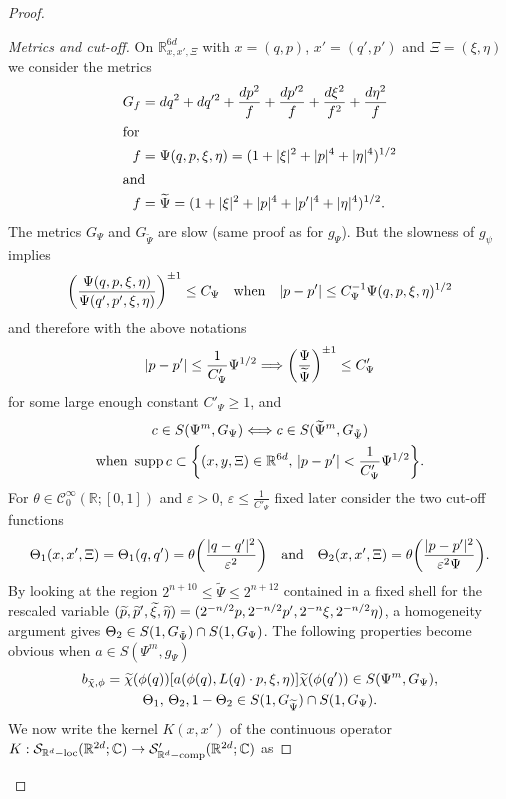 \documentclass[10pt]{amsart}
\theoremstyle{definition}\newtheorem{defi}[theo]{Definition}\newtheorem{rema}[theo]{Remark}\newtheorem{exam}[theo]{Example}\newtheorem{exem}[theo]{Example}\newtheorem{nota}[theo]{Notation}
\newcommand{\C}{\mathbb{C}}
\newcommand{\R}{\mathbb{R}}
\newcommand{\clC}{\mathcal{C}}
\newcommand{\clS}{\mathcal{S}}
\DeclareMathOperator{\ccomp}{comp}
\DeclareMathOperator{\suppp}{supp}
\DeclareMathOperator{\locc}{loc}
\let\oldtilde\tilde
\renewcommand*{\tilde}[1]{\mathchoice{\widetilde{#1}}{\widetilde{#1}}{\oldtilde{#1}}{\oldtilde{#1}}}
\let\originalleft\left
\let\originalright\right
\renewcommand{\left}{\mathopen{}\mathclose\bgroup\originalleft}
\renewcommand{\right}{\aftergroup\egroup\originalright}
\renewcommand*{\to}{\mathchoice{\longrightarrow}{\rightarrow}{\rightarrow}{\rightarrow}}
\renewcommand*{\implies}{\mathchoice{\Longrightarrow}{\Rightarrow}{\Rightarrow}{\Rightarrow}}
\begin{document}
\begin{proof}
\begin{proof}[{Metrics and cut-off}]
On $\R_{x,x',\Xi}^{6d}$ with $x=(q,p)$, $x'=(q',p')$ and $\Xi=(\xi,\eta)$ we consider the metrics
\begin{align*}
G_{f} &=dq^{2}+dq'^{2}+\frac{dp^{2}}{f}+\frac{dp'^{2}}{f}+\frac{d\xi^{2}}{f^{2}}+\frac{d\eta^{2}}{f}\\
\intertext{for}
f &=\Psi(q,p,\xi,\eta)=(1+|\xi|^{2}+|p|^{4}+|\eta|^{4})^{1/2}\\
\intertext{and} 
f &=\widetilde{\Psi}=(1+|\xi|^{2}+|p|^{4}+|p'|^{4}+|\eta|^{4})^{1/2}.
\end{align*}
The metrics $G_{\Psi}$ and $G_{\widetilde{\Psi}}$ are slow (same proof as for $g_{\Psi}$). But the slowness of $g_{\psi}$ implies
\[
\left(\frac{\Psi(q,p,\xi,\eta)}{\Psi(q',p',\xi,\eta)}\right)^{\pm 1}\leq C_{\Psi}\quad\text{when}\quad |p-p'|\leq C_{\Psi}^{-1}\Psi(q,p,\xi,\eta)^{1/2}
\]
and therefore with the above notations
\[
|p-p'|\leq \frac{1}{C'_{\Psi}}\Psi^{1/2}\implies \left(\frac{\Psi}{\tilde{\Psi}}\right)^{\pm 1}\leq C'_{\Psi}
\]
for some large enough constant $C'_{\Psi}\geq 1$, and
\begin{multline*}
c\in S(\Psi^{m},G_{\Psi})\Longleftrightarrow c\in S(\widetilde{\Psi}^{m},G_{\tilde{\Psi}})\\
\text{when }\suppp c\subset
\left\{(x,y,\Xi)\in \R^{6d},\, |p-p'|< \frac{1}{C'_{\Psi}}\Psi^{1/2}\right\}.
\end{multline*}
For $\theta\in \clC^{\infty}_{0}(\R;[0,1])$ and $\varepsilon>0$, $\varepsilon\leq \frac{1}{C'_{\Psi}}$ fixed later consider the two cut-off functions
\[
\Theta_{1}(x,x',\Xi)=\Theta_1(q,q')=\theta\left(\frac{|q-q'|^{2}}{\varepsilon^{2}}\right)\quad\text{and}\quad \Theta_{2}(x,x',\Xi)=\theta\left(\frac{|p-p'|^{2}}{\varepsilon^{2}\Psi}\right).
\]
By looking at the region $2^{n+10}\leq \widetilde{\Psi}\leq 2^{n+12}$ contained in a fixed shell for the rescaled variable $(\tilde{p},\tilde{p}',\tilde{\xi},\tilde{\eta})=(2^{-n/2}p,2^{-n/2}p',2^{-n}\xi,2^{-n/2}\eta)$, a homogeneity argument gives $\Theta_{2}\in S(1,G_{\tilde{\Psi}})\cap S(1,G_{\Psi})$. The following properties become obvious when $a\in S(\Psi^{m},g_{\Psi})$
\begin{multline*}
 b_{\tilde\chi,\phi}=\tilde\chi(\phi(q))
[a(\phi(q),L(q)\cdot p,\xi,\eta)]\tilde\chi(\phi(q'))\in S(\Psi^{m},G_{\Psi}),\\
 \Theta_{1},\,\Theta_{2}, 1-\Theta_{2}\in S(1,G_{\widetilde{\Psi}})\cap S(1,G_{\Psi}).
\end{multline*}
We now write the kernel $K(x,x')$ of the continuous operator $K:\clS_{\R^{d}-\locc}(\R^{2d};\C)\to \clS'_{\R^{d}-\ccomp}(\R^{2d};\C)$ as

\end{proof}
\end{proof}
\end{document}
